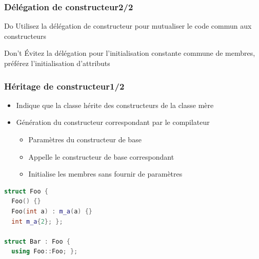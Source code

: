 \documentclass[C++.tex]{subfiles}
\begin{document}
\begin{frame}[fragile]
	\frametitle{Délégation de constructeur\titlehfill{}2/2}
	\begin{exampleblock}{Do}
		Utilisez la délégation de constructeur pour mutualiser le code commun aux constructeurs

	\end{exampleblock}

	\begin{alertblock}{Don't}
		Évitez la délégation pour l'initialisation constante commune de membres, préférez l'initialisation d'attributs
	\end{alertblock}
\end{frame}

\begin{frame}[fragile]
	\frametitle{Héritage de constructeur\titlehfill{}1/2}
	\begin{itemize}
		\item Indique que la classe hérite des constructeurs de la classe mère
		\item Génération du constructeur correspondant par le compilateur
		\begin{itemize}
			\item Paramètres du constructeur de base
			\item Appelle le constructeur de base correspondant
			\item Initialise les membres sans fournir de paramètres

		\end{itemize}
	\end{itemize}

	\begin{lstlisting}[language=C++]
struct Foo {
  Foo() {}
  Foo(int a) : m_a(a) {}
  int m_a{2}; };

struct Bar : Foo {
  using Foo::Foo; };\end{lstlisting}
\end{frame}
\end{document}
